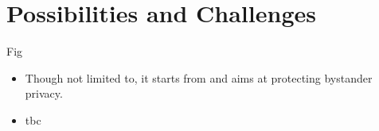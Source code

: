 \section{Possibilities and Challenges}
Fig


\begin{itemize}
  \item Though not limited to, it starts from and aims at protecting bystander privacy.
  \item tbc

\end{itemize}


\newpage
